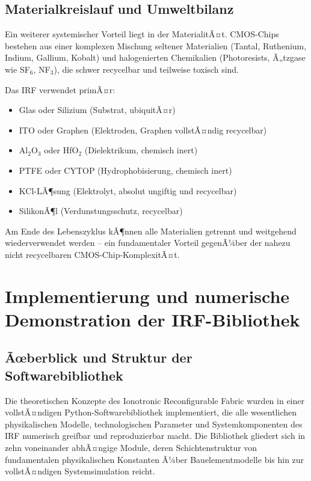 ﻿\documentclass[a4paper,12pt]{scrreprt}
\theoremstyle{definition}
\begin{document}
\subsection{Materialkreislauf und Umweltbilanz}

Ein weiterer systemischer Vorteil liegt in der MaterialitÃ¤t.
CMOS-Chips bestehen aus einer komplexen Mischung seltener Materialien
(Tantal, Ruthenium, Indium, Gallium, Kobalt) und halogenierten Chemikalien
(Photoresists, Ã„tzgase wie SF$_6$, NF$_3$), die schwer recycelbar und
teilweise toxisch sind.

Das IRF verwendet primÃ¤r:
\begin{itemize}
	\item Glas oder Silizium (Substrat, ubiquitÃ¤r)
	\item ITO oder Graphen (Elektroden, Graphen vollstÃ¤ndig recycelbar)
	\item Al$_2$O$_3$ oder HfO$_2$ (Dielektrikum, chemisch inert)
	\item PTFE oder CYTOP (Hydrophobisierung, chemisch inert)
	\item KCl-LÃ¶sung (Elektrolyt, absolut ungiftig und recycelbar)
	\item SilikonÃ¶l (Verdunstungsschutz, recycelbar)
\end{itemize}
Am Ende des Lebenszyklus kÃ¶nnen alle Materialien getrennt und weitgehend
wiederverwendet werden -- ein fundamentaler Vorteil gegenÃ¼ber der
nahezu nicht recycelbaren CMOS-Chip-KomplexitÃ¤t.

\section{Implementierung und numerische Demonstration der IRF-Bibliothek}
\label{sec:demo}

\subsection{Ãœberblick und Struktur der Softwarebibliothek}

Die theoretischen Konzepte des Ionotronic Reconfigurable Fabric wurden in einer
vollstÃ¤ndigen Python-Softwarebibliothek implementiert, die alle wesentlichen
physikalischen Modelle, technologischen Parameter und Systemkomponenten des IRF
numerisch greifbar und reproduzierbar macht. Die Bibliothek gliedert sich in zehn
voneinander abhÃ¤ngige Module, deren Schichtenstruktur von fundamentalen
physikalischen Konstanten Ã¼ber Bauelementmodelle bis hin zur vollstÃ¤ndigen
Systemsimulation reicht.
\end{document}
